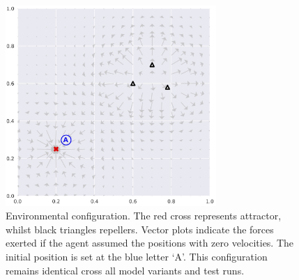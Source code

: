 \documentclass[utf8]{frontiersSCNS}
\newcommand{\bs}{\boldsymbol}
\begin{document}

\begin{figure}[bh!]
	\begin{center}
	\includegraphics[width=8cm]{diagram-environment-v0}
	\end{center}
	\caption{Environmental configuration. The red cross represents attractor, whilst black triangles repellers. Vector plots indicate the forces exerted if the agent assumed the positions with zero velocities. The initial position is set at the blue letter `A'. This configuration remains identical cross all model variants and test runs.}
	\label{fig:env}
\end{figure}
\end{document}
